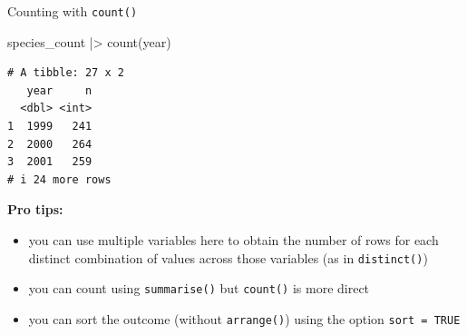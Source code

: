 \documentclass[
  ignorenonframetext,
  aspectratio=169,
]{beamer}
\newenvironment{Shaded}{\begin{snugshade}}{\end{snugshade}}
\newcommand{\FunctionTok}[1]{\textcolor[rgb]{0.28,0.35,0.67}{#1}}
\newcommand{\NormalTok}[1]{\textcolor[rgb]{0.00,0.23,0.31}{#1}}
\newcommand{\SpecialCharTok}[1]{\textcolor[rgb]{0.37,0.37,0.37}{#1}}
\providecommand{\tightlist}{%
  \setlength{\itemsep}{0pt}\setlength{\parskip}{0pt}}
\let\oldtexttt\texttt
\renewcommand{\texttt}[1]{\colorbox{gray!20}{\oldtexttt{#1}}}
\begin{document}
\begin{frame}[fragile]{Counting with \texttt{count()}}
\protect{}\label{counting-with-count}
\footnotesize

\begin{Shaded}
\begin{Highlighting}[]
\NormalTok{species\_count }\SpecialCharTok{|\textgreater{}} \FunctionTok{count}\NormalTok{(year)}
\end{Highlighting}
\end{Shaded}

\begin{verbatim}
# A tibble: 27 x 2
   year     n
  <dbl> <int>
1  1999   241
2  2000   264
3  2001   259
# i 24 more rows
\end{verbatim}

\normalsize

\pause

\textbf{Pro tips:}

\begin{itemize}
\tightlist
\item
  you can use multiple variables here to obtain the number of rows for
  each distinct combination of values across those variables (as in
  \texttt{distinct()})
\item
  you can count using \texttt{summarise()} but \texttt{count()} is more
  direct
\item
  you can sort the outcome (without \texttt{arrange()}) using the option
  \texttt{sort\ =\ TRUE}
\end{itemize}
\end{frame}
\end{document}
